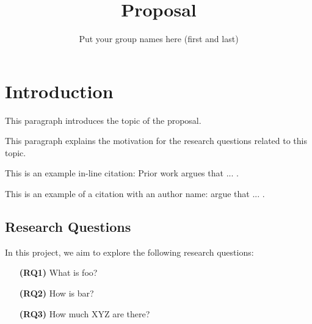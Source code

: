 \documentclass[manuscript,authorversion,nonacm]{acmart} %
\begin{document}
\title[Proposal]{Proposal}


\author{Put your group names here (first and last)}

\renewcommand{\shortauthors}{Short author names (just last names)}

\maketitle



\section{Introduction}

This paragraph introduces the topic of the proposal.

This paragraph explains the motivation for the research questions related to this topic.

This is an example in-line citation: Prior work argues that ... \cite{andalibi2017sensitive}. \newline

This is an example of a citation with an author name: \citet{andalibi2017sensitive} argue that ... .



\subsection{Research Questions}

In this project, we aim to explore the following research questions:

\begin{itemize}
    \item [\textbf{(RQ1)}] What is foo?
    \item [\textbf{(RQ2)}] How is bar?
    \item [\textbf{(RQ3)}] How much XYZ are there?
\end{itemize}


\end{document}
